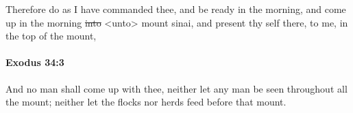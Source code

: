 			\begin{framed}
			\scriptsize
				\begin{compactdesc}
					\item[OTR2] Therefore do as I have commanded thee, and be ready in the morning, and come up in the morning \sout{into} <unto> mount sinai, and present thy self there, to me, in the top of the mount,
				\end{compactdesc}
			\end{framed}

		\paragraph{Exodus 34:3} %
			\label{EXODUS-34-3}

			And no man shall come up with thee, neither let any man be seen throughout all the mount; neither let the flocks nor herds feed before that mount.


